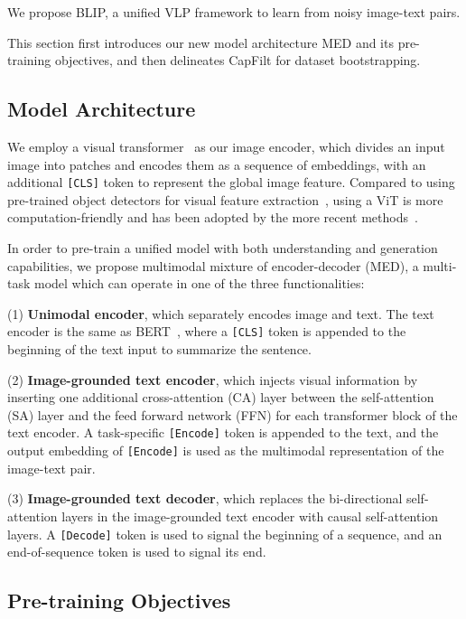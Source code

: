 \label{sec:method}

We propose BLIP, a unified VLP framework to learn from noisy image-text pairs.

This section first introduces our new model architecture MED and its pre-training objectives, and then delineates CapFilt for dataset bootstrapping. 

\subsection{Model Architecture}
\label{sec:med}

We employ a visual transformer~\cite{vit} as our image encoder, which divides an input image into patches and encodes them as a sequence of embeddings, with an additional \texttt{[CLS]} token to represent the global image feature. Compared to using pre-trained object detectors for visual feature extraction~\cite{uniter}, using a ViT is more computation-friendly and has been adopted by the more recent methods~\cite{ALBEF,ViLT}.

In order to pre-train a unified model with both understanding and generation capabilities, we propose multimodal mixture of encoder-decoder (MED), a multi-task model which can operate in one of the three functionalities:

(1) \textbf{Unimodal encoder}, which separately encodes image and text. The text encoder is the same as BERT~\cite{bert}, where a \texttt{[CLS]} token is appended to the beginning of the text input to summarize the sentence.

(2) \textbf{Image-grounded text encoder}, which injects visual information by inserting one additional cross-attention (CA) layer between the self-attention (SA) layer and the feed forward network (FFN) for each transformer block of the text encoder. A task-specific \texttt{[Encode]} token is appended to the text, and the output embedding of \texttt{[Encode]} is used as the multimodal representation of the image-text pair. 

(3) \textbf{Image-grounded text decoder}, which replaces the bi-directional self-attention layers in the image-grounded text encoder with causal self-attention layers. A \texttt{[Decode]} token is used to signal the beginning of a sequence, and an end-of-sequence token is used to signal its end.

\subsection{Pre-training Objectives}

